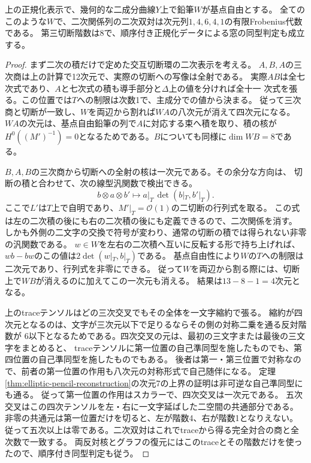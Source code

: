 \begin{proposition}[非可逆模型の全鉛筆における有限双対]\label{prop:conductor-pencil-frobenius}
上の正規化表示で、幾何的な二成分曲線$Y$上で鉛筆$W$が基点自由とする。
全てのこのような$W$で、二次関係列の二次双対は次元列$1,4,6,4,1$の有限Frobenius代数である。
第三切断階数は8で、順序付き正規化データによる窓の同型判定も成立する。
\end{proposition}
\begin{proof}
まず二次の積だけで定めた交互切断環の二次表示を考える。
$A,B,A$の三次商は上の計算で12次元で、実際の切断への写像は全射である。
実際$AB$は全七次式であり、$A$と七次式の積も導手部分と$\Delta$上の値を分ければ全十一
次式を張る。この位置では$T$への制限は次数1で、主成分での値から決まる。
従って三次商と切断が一致し、$W$を両辺から割れば$W A$の八次元が消えて四次元になる。
$W A$の次元は、基点自由鉛筆の列で$A$に対応する束へ積を取り、積の核が
$H^0((M')^{-1})=0$となるためである。$B$についても同様に$\dim W B=8$である。

$B,A,B$の三次商から切断への全射の核は一次元である。その余分な方向は、
切断の積と合わせて、次の線型汎関数で検出できる。
\[
 b\otimes a\otimes b'\longmapsto
 a|_T\,\det(b|_T,b'|_T).
\]
ここで$L'$は$T$上で自明であり、$M'|_T=\mathcal O(1)$の二切断の行列式を取る。
この式は左の二次積の後にも右の二次積の後にも定義できるので、二次関係を消す。
しかも外側の二文字の交換で符号が変わり、通常の切断の積では得られない非零の汎関数である。
$w\in W$を左右の二次積へ互いに反転する形で持ち上げれば、
$w b-b w$のこの値は$2\det(w|_T,b|_T)$である。
基点自由性により$W$の$T$への制限は二次元であり、行列式を非零にできる。
従って$W$を両辺から割る際には、切断上で$W B$が消えるのに加えてこの一次元も消える。
結果は$13-8-1=4$次元となる。

上のtraceテンソルはどの三次交叉でもその全体を一文字縮約で張る。
縮約が四次元となるのは、文字が三次元以下で足りるならその側の対称二乗を通る反対階数が
6以下となるためである。四次交叉の元は、最初の三文字または最後の三文字をまとめると、
traceテンソルに第一位置の自己準同型を施したものでも、第四位置の自己準同型を施したものでもある。
後者は第一・第三位置で対称なので、前者の第一位置の作用も八次元の対称形式で自己随伴になる。
定理\ref{thm:elliptic-pencil-reconstruction}の次元7の上界の証明は非可逆な自己準同型にも通る。
従って第一位置の作用はスカラーで、四次交叉は一次元である。
五次交叉はこの四次テンソルを左・右に一文字延ばした二空間の共通部分である。
非零の共通元は第一位置だけを切ると、左が階数4、右が階数1となりえない。
従って五次以上は零である。二次双対はこれでtraceから得る完全対合の商と全次数で一致する。
両反対核とグラフの復元にはこのtraceとその階数だけを使ったので、順序付き同型判定も従う。
\end{proof}

